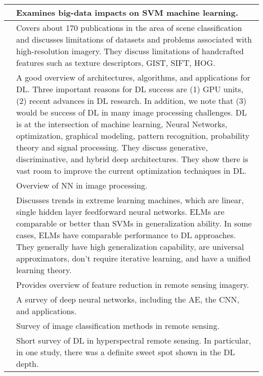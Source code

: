 \documentclass[12pt]{spieman}
\begin{document}
\begin{spacing}{1}
\begin{tabular}{|L{0.8cm}|R{15cm}|}
\cite{cavallaro2015understanding}
& Examines big-data impacts on SVM machine learning. \\
\hline

\cite{Cheng}
& Covers about 170 publications in the area of scene classification and discusses limitations of datasets and problems associated with high-resolution imagery. They discuss limitations of handcrafted features such as texture descriptors, GIST, SIFT, HOG. \\
\hline

\cite{Deng2014}
& A good overview of architectures, algorithms, and applications for DL. Three important reasons for DL success are (1) GPU units, (2) recent advances in DL research. In addition, we note that (3) would be success of DL in many image processing challenges. DL is at the intersection of machine learning, Neural Networks, optimization, graphical modeling, pattern recognition, probability theory and signal processing. They discuss generative, discriminative, and hybrid deep architectures. They show there is vast room to improve the current optimization techniques in DL. \\
\hline

\cite{Egmont-Petersen2002}
& Overview of NN in image processing. \\
\hline

\cite{huang2015trends}
& Discusses trends in extreme learning machines, which are linear, single hidden layer feedforward neural networks. ELMs are comparable or better than SVMs in generalization ability. In some cases, ELMs have comparable performance to DL approaches. They generally have high generalization capability, are universal approximators, don't require iterative learning, and have a unified learning theory. \\
\hline

\cite{jia2013feature}
& Provides overview of feature reduction in remote sensing imagery. \\
\hline

\cite{liu2016survey}
& A survey of deep neural networks, including the AE, the CNN, and applications. \\
\hline

\cite{lu2007survey}
& Survey of image classification methods in remote sensing. \\
\hline

\cite{petersson2016hyperspectral}
& Short survey of DL in hyperspectral remote sensing. In particular, in one study, there was a definite sweet spot shown in the DL depth. \\
\hline


\end{tabular}
\end{spacing}
\end{document}
